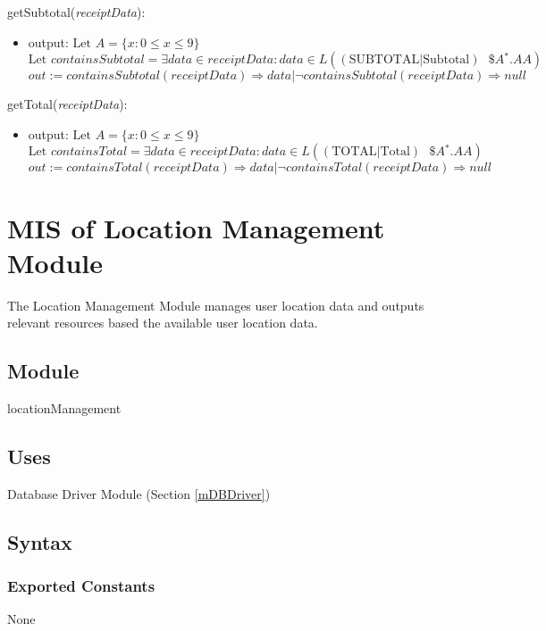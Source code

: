 \documentclass[12pt, titlepage]{article}
\begin{document}
\noindent getSubtotal(\textit{receiptData}):
\begin{itemize}
  \item output: $\text{Let } A=\{x : 0 \leq x \leq 9\}$ \\
                $\text{Let } containsSubtotal=\exists data \in receiptData : data \in L((\text{SUBTOTAL}|\text{Subtotal})\text{ }\$A{}^\ast.AA)$ \\
                $out := containsSubtotal(receiptData) \Rightarrow data | \neg containsSubtotal(receiptData) \Rightarrow null$
\end{itemize}

\noindent getTotal(\textit{receiptData}):
\begin{itemize}
  \item output: $\text{Let } A=\{x : 0 \leq x \leq 9\}$ \\
                $\text{Let } containsTotal=\exists data \in receiptData : data \in L((\text{TOTAL}|\text{Total})\text{ }\$A{}^\ast.AA)$ \\
                $out := containsTotal(receiptData) \Rightarrow data | \neg containsTotal(receiptData) \Rightarrow null$
\end{itemize}

\newpage

\section{MIS of Location Management Module} \label{mLocation} 
The Location Management Module manages user location data and outputs relevant resources based the available user location data.

\subsection{Module}

locationManagement

\subsection{Uses}

Database Driver Module (Section \ref{mDBDriver})

\subsection{Syntax}

\subsubsection{Exported Constants}
None
\end{document}
